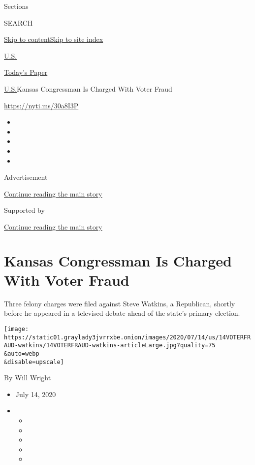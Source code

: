 Sections

SEARCH

\protect\hyperlink{site-content}{Skip to
content}\protect\hyperlink{site-index}{Skip to site index}

\href{https://www.nytimes3xbfgragh.onion/section/us}{U.S.}

\href{https://myaccount.nytimes3xbfgragh.onion/auth/login?response_type=cookie\&client_id=vi}{}

\href{https://www.nytimes3xbfgragh.onion/section/todayspaper}{Today's
Paper}

\href{/section/us}{U.S.}\textbar{}Kansas Congressman Is Charged With
Voter Fraud

\url{https://nyti.ms/30a8I3P}

\begin{itemize}
\item
\item
\item
\item
\item
\end{itemize}

Advertisement

\protect\hyperlink{after-top}{Continue reading the main story}

Supported by

\protect\hyperlink{after-sponsor}{Continue reading the main story}

\hypertarget{kansas-congressman-is-charged-with-voter-fraud}{%
\section{Kansas Congressman Is Charged With Voter
Fraud}\label{kansas-congressman-is-charged-with-voter-fraud}}

Three felony charges were filed against Steve Watkins, a Republican,
shortly before he appeared in a televised debate ahead of the state's
primary election.

\texttt{[image: https://static01.graylady3jvrrxbe.onion/images/2020/07/14/us/14VOTERFRAUD-watkins/14VOTERFRAUD-watkins-articleLarge.jpg?quality=75\\\&auto=webp\\\&disable=upscale]}

By Will Wright

\begin{itemize}
\item
  July 14, 2020
\item
  \begin{itemize}
  \item
  \item
  \item
  \item
  \item
  \end{itemize}
\end{itemize}

